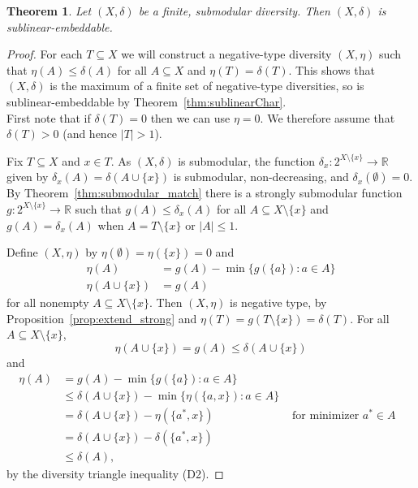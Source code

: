 \documentclass{article}
\theoremstyle{plain}
\newtheorem{theorem}{Theorem}
\theoremstyle{definition}
\renewcommand{\Re}{\mathbb{R}}
\begin{document}
\begin{theorem} \label{thm:embed_submodular}
Let $(X,\delta)$ be a finite, submodular diversity. Then $(X,\delta)$ is sublinear-embeddable.
\end{theorem}
\begin{proof}
For each $T \subseteq X$ we will construct a negative-type diversity $(X,\eta)$ such that $\eta(A) \leq \delta(A)$ for all $A \subseteq X$ and $\eta(T) = \delta(T)$. This shows that $(X,\delta)$ is the maximum of a finite set of negative-type diversities, so is sublinear-embeddable by Theorem~\ref{thm:sublinearChar}. \\

First note that if $\delta(T) = 0$ then we can use $\eta = 0$. We therefore assume that $\delta(T) > 0$ (and hence $|T| > 1$).  

Fix $T \subseteq X$ and $x \in T$. As $(X,\delta)$ is submodular, the function $\delta_x:2^{X \setminus \{x\}} \rightarrow \Re$ given by $\delta_x(A) = \delta(A \cup \{x\})$ is submodular, non-decreasing, and $\delta_x(\emptyset) = 0$. By Theorem~\ref{thm:submodular_match} there is a strongly submodular function $g:2^{X \setminus \{x\}} \rightarrow \Re$ such that $g(A) \leq \delta_x(A)$ for all $A \subseteq X \setminus \{x\}$ and $g(A) = \delta_x(A)$ when $A = T \setminus \{x\}$ or $|A| \leq 1$. 

Define $(X,\eta)$ by $\eta(\emptyset)  = \eta(\{x\}) = 0$ and 
\begin{align*}
\eta(A) &= g(A) - \min\{g(\{a\}):a \in A\} \\
\eta(A \cup \{x\}) & = g(A) 
\end{align*}
for all nonempty $A \subseteq X \setminus \{x\}$.  Then $(X,\eta)$ is negative type, by Proposition~\ref{prop:extend_strong} and $\eta(T) = g(T \setminus \{x\}) = \delta(T)$. For all $A \subseteq X \setminus \{x\}$, 
\begin{equation}
\eta(A \cup \{x\}) = g(A) \leq \delta(A \cup \{x\}) \label{eq:eta_matches}
\end{equation}
and 
\begin{align*}
\eta(A) & = g(A) - \min\{g(\{a\}):a \in A\} \\
& \leq \delta(A \cup \{x\}) - \min\{\eta(\{a,x\}) : a \in A \} \\
& = \delta(A \cup \{x\}) - \eta(\{a^*,x\}) & \mbox{ for minimizer $a^* \in A$ } \\
& = \delta(A \cup \{x\}) - \delta(\{a^*,x\}) \\
& \leq \delta(A),
\end{align*}
by the diversity triangle inequality (D2).
\end{proof}
%
\end{document}
